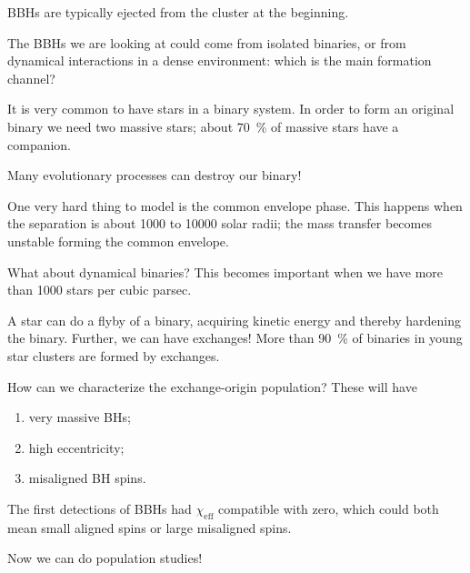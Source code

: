 \documentclass[main.tex]{subfiles}
\begin{document}
BBHs are typically ejected from the cluster at the beginning. 

The BBHs we are looking at could come from isolated binaries, or from dynamical interactions in a dense environment: which is the main formation channel?

It is very common to have stars in a binary system. 
In order to form an original binary we need two massive stars; about \SI{70}{\percent} of massive stars have a companion. 

Many evolutionary processes can destroy our binary! 

One very hard thing to model is the common envelope phase. 
This happens when the separation is about 1000 to 10000 solar radii; the mass transfer becomes unstable forming the common envelope. 

What about dynamical binaries? 
This becomes important when we have more than 1000 stars per cubic parsec. 

A star can do a flyby of a binary, acquiring kinetic energy and thereby hardening the binary. 
Further, we can have exchanges!
More than \SI{90}{\percent} of binaries in young star clusters are formed by exchanges. 

How can we characterize the exchange-origin population? 
These will have 
\begin{enumerate}
    \item very massive BHs;
    \item high eccentricity;
    \item misaligned BH spins.
\end{enumerate}

The first detections of BBHs had \(\chi _{\text{eff}}\) compatible with zero, which could both mean small aligned spins or large misaligned spins. 

Now we can do population studies!
\end{document}
